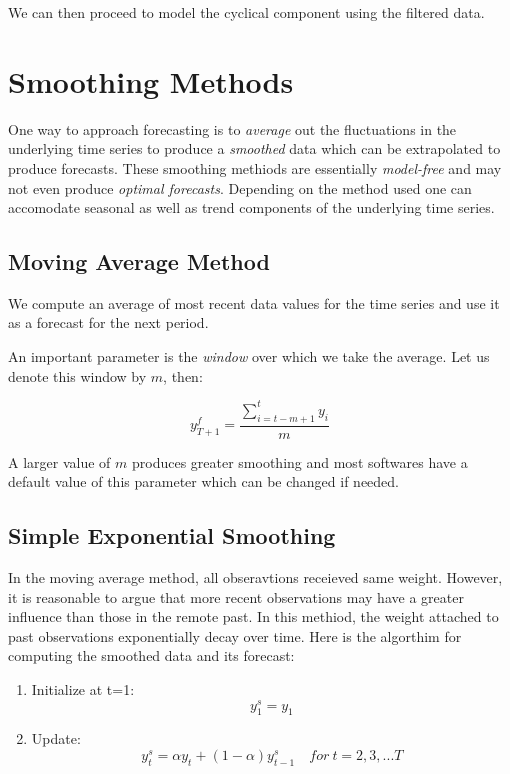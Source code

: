 \documentclass[]{book}
\theoremstyle{definition}
\theoremstyle{definition}
\theoremstyle{definition}
\theoremstyle{remark}
\begin{document}
We can then proceed to model the cyclical component using the filtered
data.

\chapter{Smoothing Methods}\label{smoothing-methods}

One way to approach forecasting is to \emph{average} out the
fluctuations in the underlying time series to produce a \emph{smoothed}
data which can be extrapolated to produce forecasts. These smoothing
methiods are essentially \emph{model-free} and may not even produce
\emph{optimal forecasts}. Depending on the method used one can
accomodate seasonal as well as trend components of the underlying time
series.

\section{Moving Average Method}\label{moving-average-method}

We compute an average of most recent data values for the time series and
use it as a forecast for the next period.

An important parameter is the \emph{window} over which we take the
average. Let us denote this window by \(m\), then:

\begin{equation}
    y^f_{T+1}=\frac{\sum_{i=t-m+1}^{t}{y_i}}{m}
    \end{equation}

A larger value of \(m\) produces greater smoothing and most softwares
have a default value of this parameter which can be changed if needed.

\section{Simple Exponential
Smoothing}\label{simple-exponential-smoothing}

In the moving average method, all obseravtions receieved same weight.
However, it is reasonable to argue that more recent observations may
have a greater influence than those in the remote past. In this methiod,
the weight attached to past observations exponentially decay over time.
Here is the algorthim for computing the smoothed data and its forecast:

\begin{enumerate}
\def\labelenumi{\arabic{enumi}.}
\item
  Initialize at t=1: \[y_1^s=y_1 \]
\item
  Update:
  \[      y_{t}^{s}= \alpha y_t + (1-\alpha)y_{t-1}^{s}  \quad for \ t=2,3,...T\]
\end{enumerate}
\end{document}
